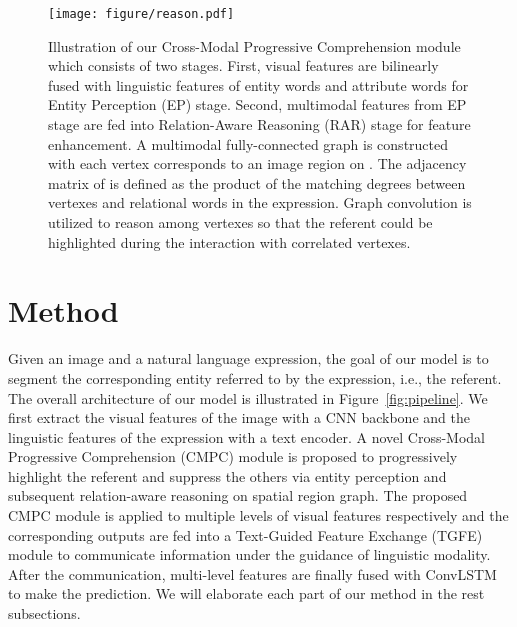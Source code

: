 \documentclass[10pt,twocolumn,letterpaper]{article}
\begin{document}
\begin{figure*}[htbp]
   \begin{center}
      \texttt{[image: figure/reason.pdf]}
   \end{center}
      \caption{Illustration of our Cross-Modal Progressive Comprehension module which consists of two stages. 
      First, visual features  are bilinearly fused with linguistic features  of entity words and 
      attribute words for Entity Perception (EP) stage. Second, multimodal features  from EP stage are fed 
      into Relation-Aware Reasoning (RAR) stage for feature enhancement. A multimodal fully-connected graph 
       is constructed with each vertex corresponds to an image region on . The adjacency matrix 
      of  is defined as the product of the matching degrees between vertexes and relational words in 
      the expression. Graph convolution is utilized to reason among vertexes so that the referent could be 
      highlighted during the interaction with correlated vertexes.}
   \label{fig:reason}
\end{figure*}

\vspace{-1mm}
\section{Method}
\vspace{-1mm}

Given an image and a natural language expression, the goal of our model is to segment the 
corresponding entity referred to by the expression, i.e., the referent. 
The overall architecture of our model is illustrated in Figure~\ref{fig:pipeline}. 
We first extract the visual features of the image with a CNN backbone and the linguistic features 
of the expression with a text encoder. 
A novel Cross-Modal Progressive Comprehension (CMPC) module is proposed to progressively highlight 
the referent and suppress the others via entity perception and subsequent relation-aware 
reasoning on spatial region graph.
The proposed CMPC module is applied to multiple levels of visual features respectively and the corresponding 
outputs are fed into a Text-Guided Feature Exchange (TGFE) module to communicate information under the guidance of linguistic modality.
After the communication, multi-level features are finally fused with ConvLSTM~\cite{xingjian2015convolutional} 
to make the prediction.
We will elaborate each part of our method in the rest subsections.

\vspace{-1mm}
\end{document}

